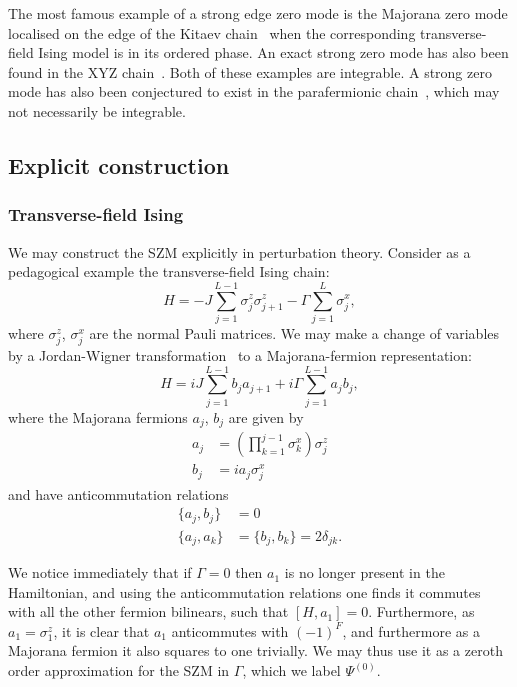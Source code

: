\documentclass [a4paper, 11pt]{article}
\begin{document}
The most famous example of a strong edge zero mode is the Majorana zero mode localised on the edge of the Kitaev chain~\cite{Kitaev} when the corresponding transverse-field Ising model is in its ordered phase. An exact strong zero mode has also been found in the XYZ chain~\cite{XYZ}. Both of these examples are integrable. A strong zero mode has also been conjectured to exist in the parafermionic chain~\cite{parafermion}, which may not necessarily be integrable.

\subsection{Explicit construction}
\subsubsection{Transverse-field Ising}
\label{sec:transisingszm}
We may construct the SZM explicitly in perturbation theory. Consider as a pedagogical example the transverse-field Ising chain:
\begin{equation}
H = -J\sum_{j=1}^{L-1} \sigma^z_j  \sigma^z_{j+1} - \Gamma \sum_{j=1}^L \sigma^x_j,
\end{equation}
where $\sigma^z_j$, $\sigma^x_j$ are the normal Pauli matrices. We may make a change of variables by a Jordan-Wigner transformation~\cite{?} to a Majorana-fermion representation:
\begin{equation}
H = i J\sum_{j=1}^{L-1} b_j  a_{j+1} + i \Gamma \sum_{j=1}^{L-1} a_j b_j,
\end{equation}
where the Majorana fermions $a_j$, $b_j$ are given by
\begin{align} a_j &= \left(\prod_{k=1}^{j-1} \sigma^x_{k}\right) \sigma^z_j \\
b_j &= i a_j \sigma^x_j 
\end{align}
and have anticommutation relations
\begin{align}
\{a_j, b_j\} &= 0 \\
\{a_j, a_k\} &= \{b_j, b_k\} = 2 \delta_{jk}.
\end{align}  

We notice immediately that if $\Gamma = 0$ then $a_1$ is no longer present in the Hamiltonian, and using the anticommutation relations one finds it commutes with all the other fermion bilinears, such that $[H, a_1]=0$. Furthermore, as $a_1 = \sigma^z_1$, it is clear that $a_1$ anticommutes with $(-1)^F$, and furthermore as a Majorana fermion it also squares to one trivially. We may thus use it as a zeroth order approximation for the SZM in $\Gamma$, which we label $\Psi^{(0)}$.
\end{document}
